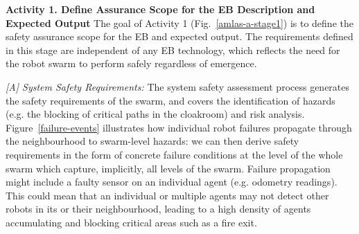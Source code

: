 \documentclass[runningheads]{llncs}
\begin{document}
	\noindent\textbf{Activity 1. Define Assurance Scope for the EB Description and Expected Output}
	The goal of Activity 1 (Fig.~\ref{amlas-a-stage1}) is to define the safety assurance scope for the EB and expected output. 
	The requirements defined in this stage are independent of any EB technology, which reflects the need for the robot swarm to perform safely regardless of emergence. 
	
	\emph{[A] System Safety Requirements:}
	The system safety assessment process generates the safety requirements of the swarm, and covers the identification of hazards (e.g. the blocking of critical paths in the cloakroom) and risk analysis.
	Figure~\ref{failure-events} illustrates how individual robot failures propagate through the neighbourhood to swarm-level hazards: we can then derive safety requirements in the form of concrete failure conditions at the level of the whole swarm which capture, implicitly, all levels of the swarm. 
	Failure propagation might include a faulty sensor on an individual agent (e.g. odometry readings). This could mean that an individual or multiple agents may not detect other robots in its or their neighbourhood, leading to a high density of agents accumulating and blocking critical areas such as a fire exit.
	
\end{document}
